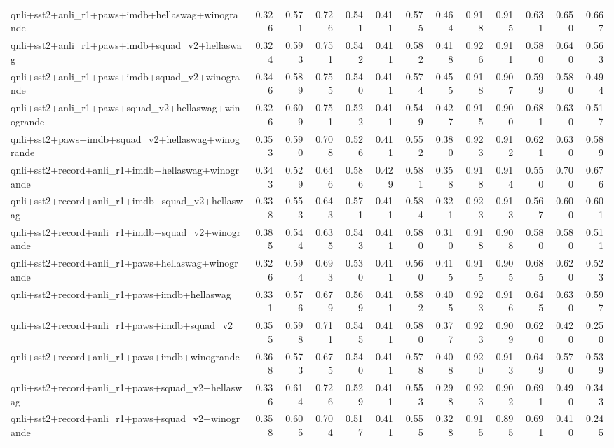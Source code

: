 \begin{table}[t]
\begin{tabular}{lrrrrrrrrrrrr}
    qnli+sst2+anli\_r1+paws+imdb+hellaswag+winogrande & 0.326 & 0.571 & 0.726 & 0.541 & 0.411 & 0.575 & 0.464 & 0.918 & 0.915 & 0.631 & 0.650 & 0.667 \\
    qnli+sst2+anli\_r1+paws+imdb+squad\_v2+hellaswag & 0.324 & 0.593 & 0.751 & 0.542 & 0.411 & 0.582 & 0.418 & 0.926 & 0.911 & 0.580 & 0.640 & 0.563 \\
    qnli+sst2+anli\_r1+paws+imdb+squad\_v2+winogrande & 0.346 & 0.589 & 0.755 & 0.540 & 0.411 & 0.574 & 0.455 & 0.918 & 0.907 & 0.599 & 0.580 & 0.494 \\
    qnli+sst2+anli\_r1+paws+squad\_v2+hellaswag+winogrande & 0.326 & 0.609 & 0.751 & 0.522 & 0.411 & 0.549 & 0.427 & 0.915 & 0.900 & 0.681 & 0.630 & 0.517 \\
    qnli+sst2+paws+imdb+squad\_v2+hellaswag+winogrande & 0.353 & 0.590 & 0.708 & 0.526 & 0.411 & 0.552 & 0.380 & 0.923 & 0.912 & 0.621 & 0.630 & 0.589 \\
    qnli+sst2+record+anli\_r1+imdb+hellaswag+winogrande & 0.343 & 0.529 & 0.646 & 0.586 & 0.429 & 0.581 & 0.358 & 0.918 & 0.914 & 0.550 & 0.700 & 0.676 \\
    qnli+sst2+record+anli\_r1+imdb+squad\_v2+hellaswag & 0.338 & 0.553 & 0.643 & 0.571 & 0.411 & 0.584 & 0.321 & 0.923 & 0.913 & 0.567 & 0.600 & 0.601 \\
    qnli+sst2+record+anli\_r1+imdb+squad\_v2+winogrande & 0.385 & 0.544 & 0.635 & 0.543 & 0.411 & 0.580 & 0.310 & 0.918 & 0.908 & 0.580 & 0.580 & 0.511 \\
    qnli+sst2+record+anli\_r1+paws+hellaswag+winogrande & 0.326 & 0.594 & 0.693 & 0.530 & 0.411 & 0.560 & 0.415 & 0.915 & 0.905 & 0.685 & 0.620 & 0.523 \\
    qnli+sst2+record+anli\_r1+paws+imdb+hellaswag & 0.331 & 0.576 & 0.679 & 0.569 & 0.411 & 0.582 & 0.405 & 0.923 & 0.916 & 0.645 & 0.630 & 0.597 \\
    qnli+sst2+record+anli\_r1+paws+imdb+squad\_v2 & 0.355 & 0.598 & 0.711 & 0.545 & 0.411 & 0.580 & 0.377 & 0.923 & 0.909 & 0.620 & 0.420 & 0.250 \\
    qnli+sst2+record+anli\_r1+paws+imdb+winogrande & 0.368 & 0.573 & 0.675 & 0.540 & 0.411 & 0.578 & 0.408 & 0.920 & 0.913 & 0.649 & 0.570 & 0.539 \\
    qnli+sst2+record+anli\_r1+paws+squad\_v2+hellaswag & 0.336 & 0.614 & 0.726 & 0.529 & 0.411 & 0.553 & 0.298 & 0.923 & 0.902 & 0.691 & 0.490 & 0.343 \\
    qnli+sst2+record+anli\_r1+paws+squad\_v2+winogrande & 0.358 & 0.605 & 0.704 & 0.517 & 0.411 & 0.555 & 0.328 & 0.915 & 0.895 & 0.691 & 0.410 & 0.245 \\

\end{tabular}
\end{table}
